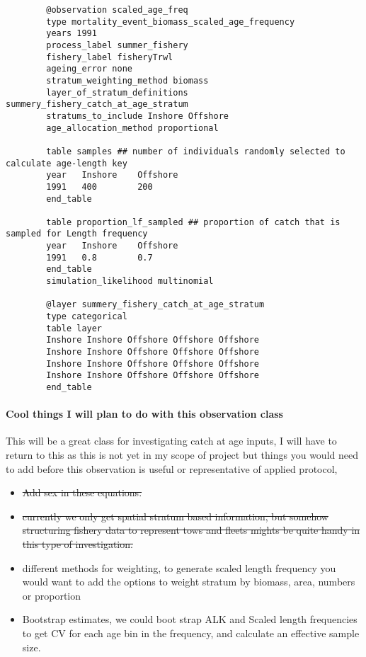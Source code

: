 {\small{\begin{verbatim}
		@observation scaled_age_freq
		type mortality_event_biomass_scaled_age_frequency
		years 1991
		process_label summer_fishery
		fishery_label fisheryTrwl
		ageing_error none
		stratum_weighting_method biomass
		layer_of_stratum_definitions summery_fishery_catch_at_age_stratum
		stratums_to_include Inshore Offshore
		age_allocation_method proportional
		
		table samples ## number of individuals randomly selected to calculate age-length key
		year   Inshore    Offshore
		1991   400        200
		end_table
		
		table proportion_lf_sampled ## proportion of catch that is sampled for Length frequency
		year   Inshore    Offshore
		1991   0.8        0.7
		end_table
		simulation_likelihood multinomial
		
		@layer summery_fishery_catch_at_age_stratum
		type categorical
		table layer 
		Inshore Inshore Offshore Offshore Offshore
		Inshore Inshore Offshore Offshore Offshore
		Inshore Inshore Offshore Offshore Offshore
		Inshore Inshore Offshore Offshore Offshore
		end_table
		\end{verbatim}}}


\paragraph*{Cool things I will plan to do with this observation class}
This will be a great class for investigating catch at age inputs, I will have to return to this as this is not yet in my scope of project but things you would need to add before this observation is useful or representative of applied protocol,

\begin{itemize}
	\item \sout{Add sex in these equations.}
	\item \sout{currently we only get spatial stratum based information, but somehow structuring fishery data to represent tows and fleets mights be quite handy in this type of investigation.}
	\item different methods for weighting, to generate scaled length frequency you would want to add the options to weight stratum by biomass, area, numbers or proportion
	\item Bootstrap estimates, we could boot strap ALK and Scaled length frequencies to get CV for each age bin in the frequency, and calculate an effective sample size.
\end{itemize}


